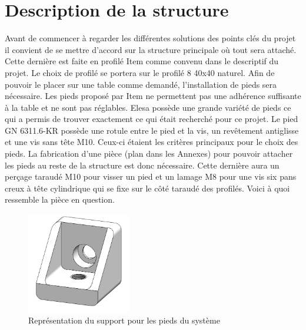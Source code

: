 \section{Description de la structure}\label{sec:DescStruct}
Avant de commencer à regarder les différentes solutions des points clés du projet il convient de se mettre d'accord
sur la structure principale où tout sera attaché. Cette dernière est faite en profilé Item \cite{Item} comme convenu dans le descriptif
du projet. Le choix de profilé se portera sur le profilé 8 40x40 naturel. Afin de pouvoir le placer sur une table comme demandé, l'installation de pieds sera nécessaire. Les pieds proposé par Item ne
permettent pas une adhérence suffisante à la table et ne sont pas réglables. Elesa \cite{Elesa} possède une grande variété de pieds ce qui
a permis de trouver exactement ce qui était recherché pour ce projet. Le pied GN 6311.6-KR possède une rotule entre le pied
et la vis, un revêtement antiglisse et une vis sans tête M10. Ceux-ci étaient les critères principaux pour le choix des pieds. La fabrication d'une pièce (plan dans les Annexes) pour pouvoir attacher
les pieds au reste de la structure est donc nécessaire. Cette dernière aura un perçage taraudé M10 pour visser un pied et un lamage M8 pour
une vis six pans creux à tête cylindrique qui se fixe sur le côté taraudé des profilés. Voici à quoi ressemble la pièce en question.

\begin{figure}[H]
  \centering
  \includegraphics[width = 0.4\textwidth]{assets/figures/SupportPieds.png}
  \caption{Représentation du support pour les pieds du système}
  \label{fig:SupPieds}
\end{figure}

